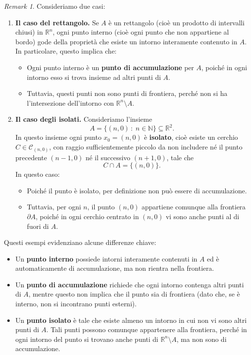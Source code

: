 \documentclass{article}
\theoremstyle{plain}
\theoremstyle{definition}
\theoremstyle{remark}
\newtheorem{rem}{Remark}
\begin{document}
\begin{rem}
Consideriamo due casi:
\begin{enumerate}
    \item \textbf{Il caso del rettangolo.}  
    Se $A$ è un rettangolo (cioè un prodotto di intervalli chiusi) in $\mathbb{R}^n$, ogni punto interno (cioè ogni punto che non appartiene al bordo) gode della proprietà che esiste un intorno interamente contenuto in $A$.  
    In particolare, questo implica che:
    \begin{itemize}
        \item Ogni punto interno è un \textbf{punto di accumulazione} per $A$, poiché in ogni intorno esso si trova insieme ad altri punti di $A$.
        \item Tuttavia, questi punti non sono punti di frontiera, perché non si ha l'intersezione dell'intorno con $\mathbb{R}^n\setminus A$.
    \end{itemize}

    \item \textbf{Il caso degli isolati.}  
    Consideriamo l'insieme 
    \[
    A=\{(n,0)\,:\;n\in\mathbb{N}\}\subseteq\mathbb{R}^2.
    \]
    In questo insieme ogni punto $x_0=(n,0)$ è \textbf{isolato}, cioè esiste un cerchio $C\in\mathcal{C}_{(n,0)}$, con raggio sufficientemente piccolo da non includere né il punto precedente $(n-1,0)$ né il successivo $(n+1,0)$, tale che
    \[
    C\cap A=\{(n,0)\}.
    \]
    In questo caso:
    \begin{itemize}
        \item Poiché il punto è isolato, per definizione non può essere di accumulazione.
        \item Tuttavia, per ogni $n$, il punto $(n,0)$ appartiene comunque alla frontiera $\partial A$, poiché in ogni cerchio centrato in $(n,0)$ vi sono anche punti al di fuori di $A$. 
    \end{itemize}
\end{enumerate}

Questi esempi evidenziano alcune differenze chiave:
\begin{itemize}
    \item Un \textbf{punto interno} possiede intorni interamente contenuti in $A$ ed è automaticamente di accumulazione, ma non rientra nella frontiera.
    \item Un \textbf{punto di accumulazione} richiede che ogni intorno contenga altri punti di $A$, mentre questo non implica che il punto sia di frontiera (dato che, se è interno, non si incontrano punti esterni).
    \item Un \textbf{punto isolato} è tale che esiste almeno un intorno in cui non vi sono altri punti di $A$. Tali punti possono comunque appartenere alla frontiera, perché in ogni intorno del punto si trovano anche punti di $\mathbb{R}^n\setminus A$, ma non sono di accumulazione.
\end{itemize}
\end{rem}
\end{document}
